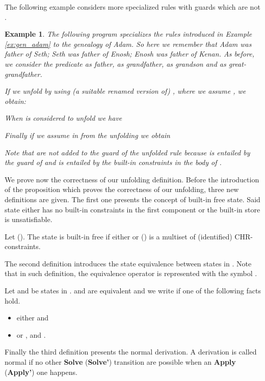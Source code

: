 \documentclass[final]{acmtrans2e}
\newtheorem{exa}[theorem]{Example}
\newenvironment{example}{\begin{exa}}{\end{exa}}
\begin{document}
The following example considers more specialized rules  with guards which are not .

\begin{example}\label{ex:gen_adam_refined}
The following  program  specializes the rules introduced in Example \ref{ex:gen_adam}
to the genealogy of Adam. So here we remember that Adam was father of Seth; Seth was father
of Enosh; Enosh was father of Kenan. As before, we consider the predicate  as father,
 as grandfather,  as grandson and  as great-grandfather.


If we unfold  by using (a suitable renamed version of) ,
where we assume , we obtain:

When  is considered to unfold  we have

Finally if we assume  in  from the unfolding we obtain


Note that   are not
added to the guard of the unfolded rule  because  is
entailed by the guard of  and  is entailed
by the built-in constraints in the body of .
\end{example}

We prove now the correctness of our unfolding definition.
Before the introduction of the proposition which proves the correctness of our unfolding, three new
definitions are given. The first one presents the concept of built-in
free state. Said state either has no built-in constraints in the first component
or the built-in store is unsatisfiable.

\begin{definition}\label{def:BFS}
Let   ().
The state  is built-in free  if either   or
 () is a multiset of (identified) CHR-constraints.
\end{definition}

The second definition introduces the state equivalence between states in .
Note that in such definition, the
equivalence operator is represented with the symbol .


\begin{definition}\label{def:SE}
Let   and   be states in .
 and  are equivalent and we write  if one of the following facts hold.
\begin{itemize}
  \item either  and 
  \item or ,  and .
\end{itemize}
\end{definition}

Finally the third definition presents the normal derivation. A derivation
is called normal if no other \textbf{Solve} (\textbf{Solve'}) transition are possible
when an \textbf{Apply} (\textbf{Apply'}) one happens.
\end{document}
